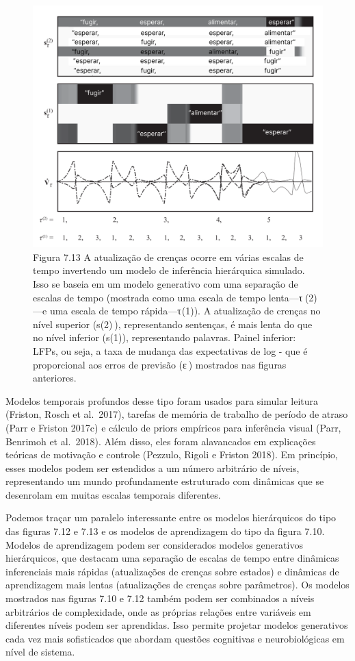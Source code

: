 \documentclass[
  12pt,
]{book}
\begin{document}
\begin{figure}
\centering
\includegraphics{images/Figura_7_13.png}
\caption{Figura 7.13 A atualização de crenças ocorre em várias escalas de tempo invertendo um modelo de inferência hierárquica simulado. Isso se baseia em um modelo generativo com uma separação de escalas de tempo (mostrada como uma escala de tempo lenta---τ    (2)---e uma escala de tempo rápida---τ (1)). A atualização de crenças no nível superior (s(2) ), representando sentenças, é mais lenta do que no nível inferior (s(1)), representando palavras. Painel inferior: LFPs, ou seja, a taxa de mudança das expectativas de log - que é proporcional aos erros de previsão (ε ) mostrados nas figuras anteriores.}
\end{figure}

Modelos temporais profundos desse tipo foram usados para simular leitura (Friston, Rosch et al.~2017), tarefas de memória de trabalho de período de atraso (Parr e Friston 2017c) e cálculo de priors empíricos para inferência visual (Parr, Benrimoh et al.~2018). Além disso, eles foram alavancados em explicações teóricas de motivação e controle (Pezzulo, Rigoli e Friston 2018). Em princípio, esses modelos podem ser estendidos a um número arbitrário de níveis, representando um mundo profundamente estruturado com dinâmicas que se desenrolam em muitas escalas temporais diferentes.

Podemos traçar um paralelo interessante entre os modelos hierárquicos do tipo das figuras 7.12 e 7.13 e os modelos de aprendizagem do tipo da figura 7.10. Modelos de aprendizagem podem ser considerados modelos generativos hierárquicos, que destacam uma separação de escalas de tempo entre dinâmicas inferenciais mais rápidas (atualizações de crenças sobre estados) e dinâmicas de aprendizagem mais lentas (atualizações de crenças sobre parâmetros). Os modelos mostrados nas figuras 7.10 e 7.12 também podem ser combinados a níveis arbitrários de complexidade, onde as próprias relações entre variáveis em diferentes níveis podem ser aprendidas. Isso permite projetar modelos generativos cada vez mais sofisticados que abordam questões cognitivas e neurobiológicas em nível de sistema.
\end{document}
